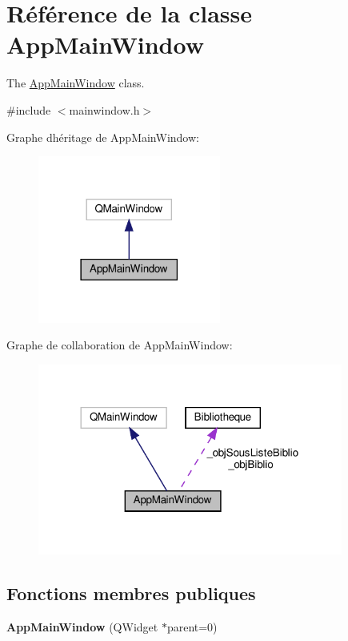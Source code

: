 \hypertarget{classAppMainWindow}{}\section{Référence de la classe App\+Main\+Window}
\label{classAppMainWindow}


The \hyperlink{classAppMainWindow}{App\+Main\+Window} class.  




{\ttfamily \#include $<$mainwindow.\+h$>$}



Graphe d\textquotesingle{}héritage de App\+Main\+Window\+:\nopagebreak
\begin{figure}[H]
\begin{center}
\leavevmode
\includegraphics[width=170pt]{classAppMainWindow__inherit__graph}
\end{center}
\end{figure}


Graphe de collaboration de App\+Main\+Window\+:\nopagebreak
\begin{figure}[H]
\begin{center}
\leavevmode
\includegraphics[width=284pt]{classAppMainWindow__coll__graph}
\end{center}
\end{figure}
\subsection*{Fonctions membres publiques}
\begin{DoxyCompactItemize}
\item 
\mbox{\label{classAppMainWindow_a80c892efaa500c1e07057923edc81839}} 
{\bfseries App\+Main\+Window} (Q\+Widget $\ast$parent=0)
\end{DoxyCompactItemize}
